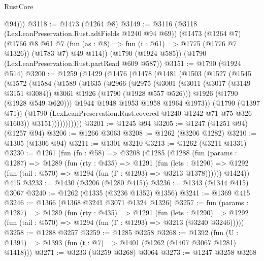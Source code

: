 \begin{lexlean}{RustCore}
\begin{coremodule}
          @94)))
@3118 := @1473 (@1264 @8)
@3149 := @3116
    (@3118 (LexLeanPreservation.Rust.adtFields @1240 @94 @69))
    (@1473
      (@1264 @7)
      (@1766
        @8
        @61
        @7
        (fun (as : @8) => fun (i : @61) => @1775 (@1776 @7 @1326))
        (@1783 @7)
        @49
        @114))
    (@1790 (@1924 @585))
    (@1790 (LexLeanPreservation.Rust.partRead @609 @587))
@3151 := @1790 (@1924 @514)
@3200 := @1259
    (@1429
      (@1476
        (@1478
          (@1481
            (@1503
              (@1527
                (@1545
                  (@1572
                    (@1584
                      (@1589
                        (@1635
                          (@2966
                            (@2975
                              (@3001
                                (@3011
                                  (@3017 (@3149 @3151 @3084))
                                  @3061
                                  @1926
                                  (@1790 (@1928 @557 @526)))
                                @1926
                                (@1790 (@1928 @549 @620)))
                              @1944
                              @1948
                              @1953
                              @1958
                              @1964
                              @1973))
                          (@1790 (@1397 @71))
                          (@1790 (LexLeanPreservation.Rust.covered @1240 @1242 @71 @75 @326 @1603))
                          @3151)))))))))))
@3201 := @1245 @94
@3205 := @1247 (@1251 @94) (@1257 @94)
@3206 := @1266 @3063
@3208 := @1262 (@3206 @1282)
@3210 := @1305 (@1306 @94)
@3211 := @1301 @3210
@3213 := @1262 (@3211 @1331)
@3230 := @1261
    (fun (fn : @58) =>
    @3208
      (@1285
        (@1288
          (fun (params : @1287) =>
          @1289
            (fun (rty : @435) =>
            @1291
              (fun (lets : @1290) =>
              @1292 (fun (tail : @570) => @1294 (fun (Γ : @1293) => @3213 @1378))))))
        @1424))
    @415
@3233 := @1430 (@3206 (@1280 @415))
@3236 := @1343 (@1344 @415) @3067
@3240 := @1262 (@1335 (@3236 @1352) @1356)
@3241 := @1369 @415
@3246 := @1366 (@1368 @3241 @3071 @1324 @1326)
@3257 := fun (params : @1287) =>
  @1289
    (fun (rty : @435) =>
    @1291
      (fun (lets : @1290) =>
      @1292 (fun (tail : @570) => @1294 (fun (Γ : @1293) => @3213 (@3240 @3246)))))
@3258 := @1288 @3257
@3259 := @1285 @3258
@3268 := @1392 (fun (U : @1391) => @1393 (fun (t : @7) => @1401 (@1262 (@1407 @3067 @1281) @1418)))
@3271 := @3233 (@3259 @3268) @3064
@3273 := @1247 @3258 @3268

\end{coremodule}
\end{lexlean}

